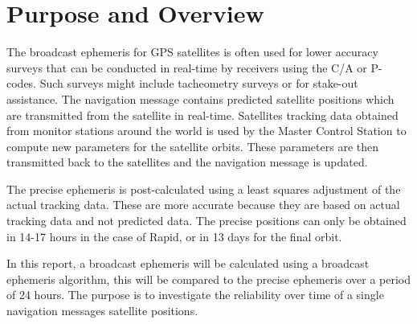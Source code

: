 
\section{Purpose and Overview}
The broadcast ephemeris for GPS satellites is often used for lower accuracy surveys that can be conducted in real-time by receivers using the C/A or P- codes. Such surveys might include tacheometry surveys or for stake-out assistance. The navigation message contains predicted satellite positions which are transmitted from the satellite in real-time. Satellites tracking data obtained from monitor stations around the world is used by the Master Control Station to compute new parameters for the satellite orbits. These parameters are then transmitted back to the satellites and the navigation message is updated.

The precise ephemeris is post-calculated using a least squares adjustment of the actual tracking data. These are more accurate because they are based on actual tracking data and not predicted data. The precise positions can only be obtained in 14-17 hours in the case of Rapid, or in 13 days for the final orbit.

In this report, a broadcast ephemeris will be calculated using a broadcast ephemeris algorithm, this will be compared to the precise ephemeris over a period of 24 hours. The purpose is to investigate the reliability over time of a single navigation messages satellite positions.